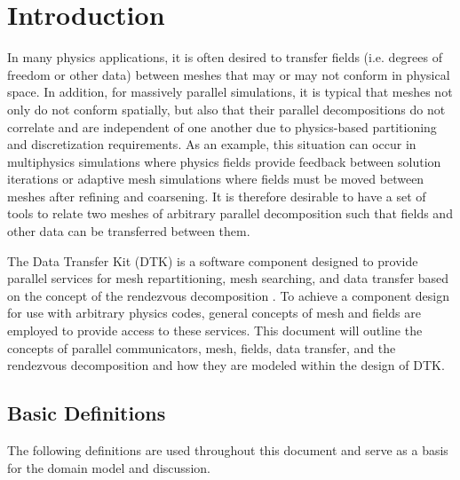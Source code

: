 \documentclass[letterpaper,12pt]{article}
\begin{document}
\section{Introduction}\label{sec:intro}
In many physics applications, it is often desired to transfer fields
(i.e. degrees of freedom or other data) between meshes that may or may
not conform in physical space. In addition, for massively parallel
simulations, it is typical that meshes not only do not conform
spatially, but also that their parallel decompositions do not
correlate and are independent of one another due to physics-based
partitioning and discretization requirements. As an example, this
situation can occur in multiphysics simulations where physics fields
provide feedback between solution iterations or adaptive mesh
simulations where fields must be moved between meshes after refining
and coarsening. It is therefore desirable to have a set of tools to
relate two meshes of arbitrary parallel decomposition such that fields
and other data can be transferred between them.

The Data Transfer Kit (DTK) is a software component designed to
provide parallel services for mesh repartitioning, mesh searching, and
data transfer based on the concept of the rendezvous decomposition
\cite{Plimpton_2004}. To achieve a component design for use with
arbitrary physics codes, general concepts of mesh and fields are
employed to provide access to these services. This document will
outline the concepts of parallel communicators, mesh, fields, data
transfer, and the rendezvous decomposition and how they are modeled
within the design of DTK.

\subsection{Basic Definitions}\label{subsec:basic_defs}

The following definitions are used throughout this document and serve
as a basis for the domain model and discussion.
\end{document}
